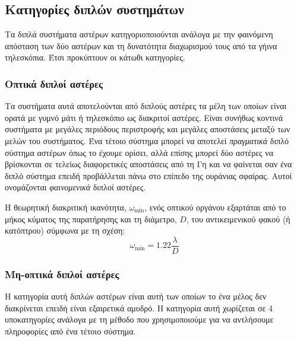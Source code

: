 \subsection{Κατηγορίες διπλών συστημάτων}
Τα διπλά συστήματα αστέρων κατηγοριοποιούνται ανάλογα με την φαινόμενη απόσταση των δύο αστέρων και τη δυνατότητα διαχωρισμού τους από τα γήινα τηλεσκόπια. Έτσι προκύπτουν οι κάτωθι κατηγορίες.

\subsubsection{Οπτικά διπλοί αστέρες}
Τα συστήματα αυτά αποτελούνται από διπλούς αστέρες τα μέλη των οποίων είναι ορατά με γυμνό μάτι ή τηλεσκόπιο ως διακριτοί αστέρες. Είναι συνήθως κοντινά συστήματα με μεγάλες περιόδους περιστροφής και μεγάλες αποστάσεις μεταξύ των μελών του συστήματος.
Ένα τέτοιο σύστημα μπορεί να αποτελεί \textit{πραγματικά} διπλό σύστημα αστέρων όπως το έχουμε ορίσει, αλλά επίσης μπορεί δύο αστέρες να βρίσκονται σε τελείως διαφορετικές αποστάσεις από τη Γη και να φαίνεται σαν ένα διπλό σύστημα επειδή προβάλλεται πάνω στο επίπεδο της ουράνιας σφαίρας. Αυτοί ονομάζονται \textit{φαινομενικά} διπλοί αστέρες.

Η θεωρητική διακριτική ικανότητα, $\omega_{\text{min}}$, ενός οπτικού οργάνου εξαρτάται από το μήκος κύματος της παρατήρησης και τη διάμετρο, $D$, του αντικειμενικού φακού (ή κατόπτρου) σύμφωνα με τη σχέση:
\begin{equation}
    \omega_{\text{min}} = 1.22 \frac{\lambda}{D}
\end{equation}

\subsubsection{Μη-οπτικά διπλοί αστέρες}
Η κατηγορία αυτή διπλών αστέρων είναι αυτή των οποίων το ένα μέλος δεν διακρίνεται επειδή είναι εξαιρετικά αμυδρό. Η κατηγορία αυτή χωρίζεται σε 4 υποκατηγορίες ανάλογα με τη μέθοδο που χρησιμοποιούμε για να αντλήσουμε πληροφορίες από ένα τέτοιο σύστημα.

